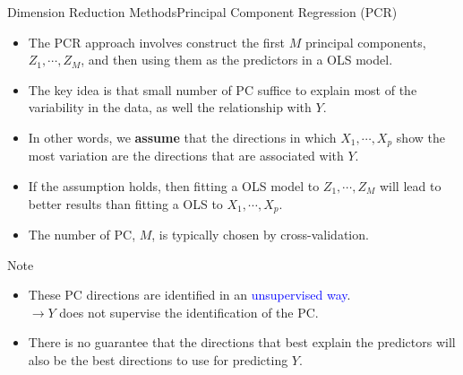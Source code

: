\begin{frame}{Dimension Reduction Methods}{Principal Component Regression (PCR)}
    \begin{itemize}

    \item The PCR approach involves construct the first $M$ principal components, $Z_1 , \cdots , Z_M $, and then using them as the predictors in a OLS model. \pause 

    \item The key idea is that small number of PC suﬃce to explain most of the variability in the data, as well the relationship with $Y$. \pause 

    \item In other words, we \textbf{assume} that the directions in which $X_1 , \cdots , X_p$ show the most variation are the directions that are associated with $Y$. \pause 

    \item If the assumption holds, then fitting a OLS model to $Z_1 , \cdots , Z_M $ will lead to better results than fitting a OLS to $X_1 , \cdots , X_p$. \pause 

    \item The number of PC, $M$, is typically chosen by cross-validation. \pause 
    \end{itemize}


    \begin{block}{Note}

    \begin{itemize}
        \item These PC directions are identified in an \textcolor{blue}{unsupervised way}. \pause \\
        $\rightarrow Y$ does not supervise the identification of the PC. \pause 
        \\ 

        \item There is no guarantee that the directions that best explain the predictors will also be the best directions to use for predicting $Y$.
    \end{itemize}
        
    \end{block}
    

    
\end{frame}